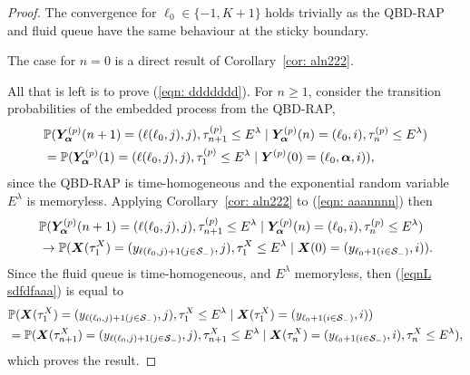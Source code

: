 \begin{proof}
The convergence for \(\ell_0\in\{-1,K+1\}\) holds trivially as the QBD-RAP and fluid queue have the same behaviour at the sticky boundary.

The case for \(n=0\) is a direct result of Corollary~\ref{cor: aln222}. %

All that is left is to prove (\ref{eqn: ddddddd}). For \(n\geq 1\), consider the transition probabilities of the embedded process from the QBD-RAP, 
\begin{align}
	&\mathbb P(\bm{Y}_{\bm{\alpha}}^{(p)}(n+1) = (\ell(\ell_0,j),j),\tau_{n+1}^{(p)}\leq E^\lambda
	\mid \bm{Y}_{\bm{\alpha}}^{(p)}(n) = (\ell_0,i),\tau_{n}^{(p)}\leq E^\lambda) \nonumber 
	\\&=\mathbb P(\bm{Y}_{\bm{\alpha}}^{(p)}(1) = (\ell(\ell_0,j),j), \tau_{1}^{(p)}\leq E^\lambda
	\mid \boldsymbol Y^{(p)}(0)=(\ell_0 ,\boldsymbol\alpha, i)), \label{eqn: aaannnn}
\end{align}
since the QBD-RAP is time-homogeneous and the exponential random variable \(E^\lambda\) is memoryless. %
Applying Corollary~\ref{cor: aln222} to (\ref{eqn: aaannnn}) then
\begin{align}
	&\mathbb P(\bm{Y}_{\bm{\alpha}}^{(p)}(n+1) = (\ell(\ell_0,j),j),\tau_{n+1}^{(p)}\leq E^\lambda
	\mid \bm{Y}_{\bm{\alpha}}^{(p)}(n) = (\ell_0,i),\tau_{n}^{(p)}\leq E^\lambda) \nonumber 
	\\&\to \mathbb P(\boldsymbol X(\tau_{1}^X) = (y_{\ell(\ell_0,j)+1(j\in\mathcal{S}_-)}, j), \tau_{1}^{X}\leq E^\lambda \mid \boldsymbol X(0) = (y_{\ell_0+1(i\in\mathcal{S}_-)},i)).\label{eqnL sdfdfaaa}
\end{align}
Since the fluid queue is time-homogeneous, and \(E^\lambda\) memoryless, then (\ref{eqnL sdfdfaaa}) is equal to 
\begin{align}
	&\mathbb P(\boldsymbol X(\tau_{1}^X) = (y_{\ell(\ell_0,j)+1(j\in\mathcal{S}_-)}, j), \tau_{1}^{X}\leq E^\lambda \mid \boldsymbol X(\tau_{1}^X) = (y_{\ell_0+1(i\in\mathcal{S}_-)},i)) \nonumber
	\\&=\mathbb P(\boldsymbol X(\tau_{n+1}^X) = (y_{\ell(\ell_0,j)+1(j\in\mathcal{S}_-)}, j), \tau_{n+1}^{X}\leq E^\lambda \mid \boldsymbol X(\tau_{n}^X) = (y_{\ell_0+1(i\in\mathcal{S}_-)},i), \tau_{n}^{X}\leq E^\lambda ),
\end{align}
which proves the result. 
\end{proof}
